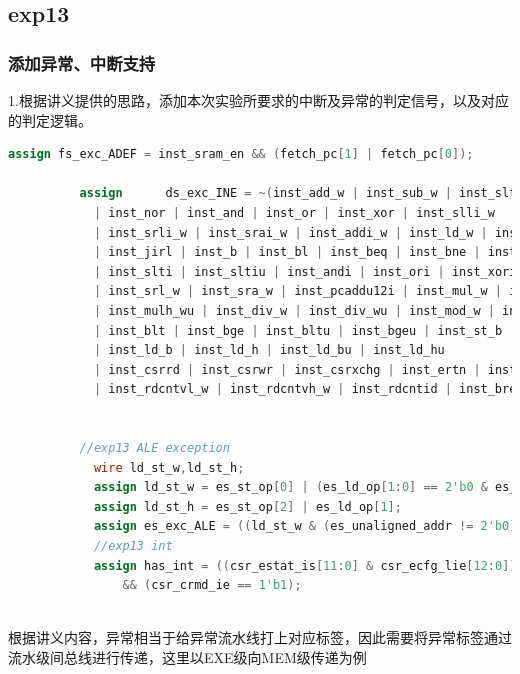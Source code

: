 \documentclass[12pt,a4paper]{article}
\begin{document}
        
            
    \subsection{exp13}
        \subsubsection{添加异常、中断支持}
          1.根据讲义提供的思路，添加本次实验所要求的中断及异常的判定信号，以及对应的判定逻辑。
          \par
          \begin{lstlisting}[language=Verilog]
          assign fs_exc_ADEF = inst_sram_en && (fetch_pc[1] | fetch_pc[0]);
    
          assign      ds_exc_INE = ~(inst_add_w | inst_sub_w | inst_slt | inst_sltu 
            | inst_nor | inst_and | inst_or | inst_xor | inst_slli_w 
            | inst_srli_w | inst_srai_w | inst_addi_w | inst_ld_w | inst_st_w 
            | inst_jirl | inst_b | inst_bl | inst_beq | inst_bne | inst_lu12i_w 
            | inst_slti | inst_sltiu | inst_andi | inst_ori | inst_xori | inst_sll_w 
            | inst_srl_w | inst_sra_w | inst_pcaddu12i | inst_mul_w | inst_mulh_w 
            | inst_mulh_wu | inst_div_w | inst_div_wu | inst_mod_w | inst_mod_wu 
            | inst_blt | inst_bge | inst_bltu | inst_bgeu | inst_st_b | inst_st_h 
            | inst_ld_b | inst_ld_h | inst_ld_bu | inst_ld_hu
            | inst_csrrd | inst_csrwr | inst_csrxchg | inst_ertn | inst_syscall
            | inst_rdcntvl_w | inst_rdcntvh_w | inst_rdcntid | inst_break) && (ds_pc != 32'b0) ;


          //exp13 ALE exception
            wire ld_st_w,ld_st_h;
            assign ld_st_w = es_st_op[0] | (es_ld_op[1:0] == 2'b0 & es_res_from_mem);
            assign ld_st_h = es_st_op[2] | es_ld_op[1];
            assign es_exc_ALE = ((ld_st_w & (es_unaligned_addr != 2'b0)) | (ld_st_h & (es_unaligned_addr[0]))) & es_valid;
            //exp13 int
            assign has_int = ((csr_estat_is[11:0] & csr_ecfg_lie[12:0]) != 12'b0)
                && (csr_crmd_ie == 1'b1);
            
          \end{lstlisting}
          根据讲义内容，异常相当于给异常流水线打上对应标签，因此需要将异常标签通过流水级间总线进行传递，这里以EXE级向MEM级传递为例
          
\end{document}
